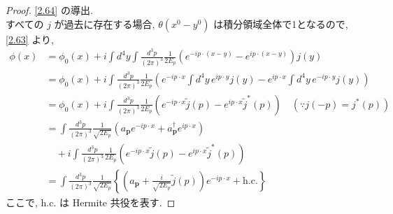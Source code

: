 \documentclass[a4paper,12pt]{article}
\begin{document}
\color{blue}
\begin{proof}
\eqref{2.64} の導出.\\
すべての $j$ が過去に存在する場合, $\theta (x^0 - y^0)$ は積分領域全体で1となるので, \eqref{2.63} より,
\begin{align*}
  \phi(x) &= \phi_0(x) + i \int d^4 y \int \frac{d^3 p}{(2\pi)^3} \frac{1}{2E_p} \left( e^{-ip \cdot (x - y)} - e^{ip \cdot (x - y)} \right) j(y) \tag{2-4.l1}\\
  &= \phi_0(x) + i \int \frac{d^3 p}{(2\pi)^3} \frac{1}{2E_p} \left( e^{-ip \cdot x} \int d^4 y\, e^{ip \cdot y} j(y) - e^{ip \cdot x} \int d^4 y\, e^{-ip \cdot y} j(y) \right) \tag{2-4.l2}\\
  &= \phi_0(x) + i \int \frac{d^3 p}{(2\pi)^3} \frac{1}{2E_p} \left( e^{-ip \cdot x} \tilde{j}(p) - e^{ip \cdot x} \tilde{j}^{*}(p) \right) \quad(\because j(-p) = j^{*}(p)) \tag{2-4.l3}\\
  &= \int \frac{d^3 p}{(2\pi)^3} \frac{1}{\sqrt{2E_p}} \left( a_{\mathbf{p}} e^{-ip \cdot x} + a_{\mathbf{p}}^\dagger e^{ip \cdot x} \right)\\
  &\quad + i \int \frac{d^3 p}{(2\pi)^3} \frac{1}{2E_p} \left( e^{-ip \cdot x} \tilde{j}(p) - e^{ip \cdot x} \tilde{j}^{*}(p) \right) \tag{2-4.l4}\\
  &= \int \frac{d^3 p}{(2\pi)^3} \frac{1}{\sqrt{2E_p}} \left\{ \left( a_{\mathbf{p}} + \frac{i}{\sqrt{2E_p}} \tilde{j}(p) \right) e^{-ip \cdot x} + \text{h.c.} \right\} \tag{2-4.l5}
\end{align*}
ここで, h.c. は Hermite 共役を表す.
\end{proof}
\color{black}
\end{document}

